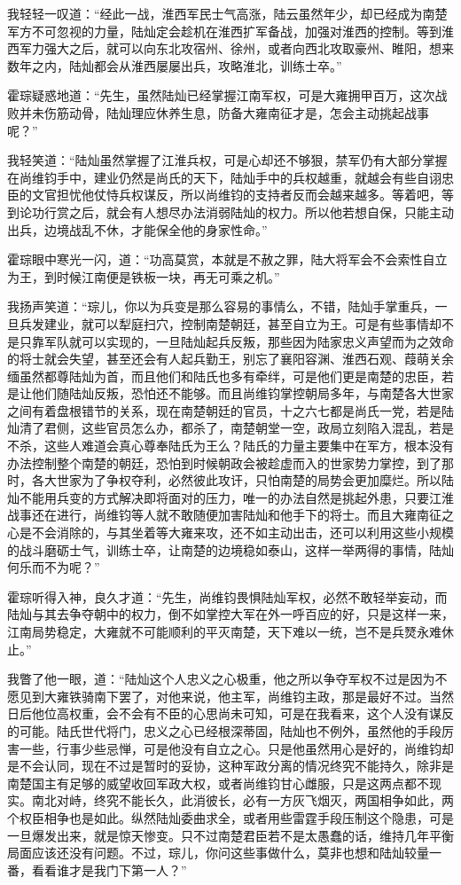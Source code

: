 我轻轻一叹道：“经此一战，淮西军民士气高涨，陆云虽然年少，却已经成为南楚军方不可忽视的力量，陆灿定会趁机在淮西扩军备战，加强对淮西的控制。等到淮西军力强大之后，就可以向东北攻宿州、徐州，或者向西北攻取豪州、睢阳，想来数年之内，陆灿都会从淮西屡屡出兵，攻略淮北，训练士卒。”

霍琮疑惑地道：“先生，虽然陆灿已经掌握江南军权，可是大雍拥甲百万，这次战败并未伤筋动骨，陆灿理应休养生息，防备大雍南征才是，怎会主动挑起战事呢？”

我轻笑道：“陆灿虽然掌握了江淮兵权，可是心却还不够狠，禁军仍有大部分掌握在尚维钧手中，建业仍然是尚氏的天下，陆灿手中的兵权越重，就越会有些自诩忠臣的文官担忧他仗恃兵权谋反，所以尚维钧的支持者反而会越来越多。等着吧，等到论功行赏之后，就会有人想尽办法消弱陆灿的权力。所以他若想自保，只能主动出兵，边境战乱不休，才能保全他的身家性命。”

霍琮眼中寒光一闪，道：“功高莫赏，本就是不赦之罪，陆大将军会不会索性自立为王，到时候江南便是铁板一块，再无可乘之机。”

我扬声笑道：“琮儿，你以为兵变是那么容易的事情么，不错，陆灿手掌重兵，一旦兵发建业，就可以犁庭扫穴，控制南楚朝廷，甚至自立为王。可是有些事情却不是只靠军队就可以实现的，一旦陆灿起兵反叛，那些因为陆家忠义声望而为之效命的将士就会失望，甚至还会有人起兵勤王，别忘了襄阳容渊、淮西石观、葭萌关余缅虽然都尊陆灿为首，而且他们和陆氏也多有牵绊，可是他们更是南楚的忠臣，若是让他们随陆灿反叛，恐怕还不能够。而且尚维钧掌控朝局多年，与南楚各大世家之间有着盘根错节的关系，现在南楚朝廷的官员，十之六七都是尚氏一党，若是陆灿清了君侧，这些官员怎么办，都杀了，南楚朝堂一空，政局立刻陷入混乱，若是不杀，这些人难道会真心尊奉陆氏为王么？陆氏的力量主要集中在军方，根本没有办法控制整个南楚的朝廷，恐怕到时候朝政会被趁虚而入的世家势力掌控，到了那时，各大世家为了争权夺利，必然彼此攻讦，只怕南楚的局势会更加糜烂。所以陆灿不能用兵变的方式解决即将面对的压力，唯一的办法自然是挑起外患，只要江淮战事还在进行，尚维钧等人就不敢随便加害陆灿和他手下的将士。而且大雍南征之心是不会消除的，与其坐着等大雍来攻，还不如主动出击，还可以利用这些小规模的战斗磨砺士气，训练士卒，让南楚的边境稳如泰山，这样一举两得的事情，陆灿何乐而不为呢？”

霍琮听得入神，良久才道：“先生，尚维钧畏惧陆灿军权，必然不敢轻举妄动，而陆灿与其去争夺朝中的权力，倒不如掌控大军在外一呼百应的好，只是这样一来，江南局势稳定，大雍就不可能顺利的平灭南楚，天下难以一统，岂不是兵燹永难休止。”

我瞥了他一眼，道：“陆灿这个人忠义之心极重，他之所以争夺军权不过是因为不愿见到大雍铁骑南下罢了，对他来说，他主军，尚维钧主政，那是最好不过。当然日后他位高权重，会不会有不臣的心思尚未可知，可是在我看来，这个人没有谋反的可能。陆氏世代将门，忠义之心已经根深蒂固，陆灿也不例外，虽然他的手段厉害一些，行事少些忌惮，可是他没有自立之心。只是他虽然用心是好的，尚维钧却是不会认同，现在不过是暂时的妥协，这种军政分离的情况终究不能持久，除非是南楚国主有足够的威望收回军政大权，或者尚维钧甘心雌服，只是这两点都不现实。南北对峙，终究不能长久，此消彼长，必有一方灰飞烟灭，两国相争如此，两个权臣相争也是如此。纵然陆灿委曲求全，或者用些雷霆手段压制这个隐患，可是一旦爆发出来，就是惊天惨变。只不过南楚君臣若不是太愚蠢的话，维持几年平衡局面应该还没有问题。不过，琮儿，你问这些事做什么，莫非也想和陆灿较量一番，看看谁才是我门下第一人？”

